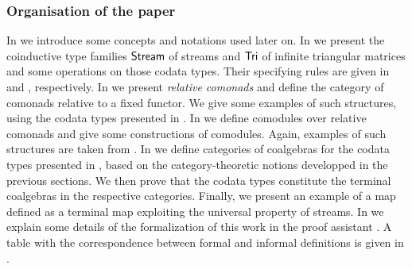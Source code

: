 \documentclass[envcountsame]{llncs}
\begin{document}
\begin{Long}
 
 \subsubsection*{Organisation of the paper}
  In  we introduce some concepts and notations used later on.
  In  we present the coinductive type families $\mathsf{Stream}$ of streams and $\mathsf{Tri}$ of infinite triangular matrices and some operations on those
           codata types.
   Their specifying rules are given in  and , respectively.
  In  we present \emph{relative comonads} and define the category of comonads relative to a fixed functor.
    We give some examples of such structures, using the codata types presented in .
  In  we define comodules over relative comonads and give some constructions of comodules.
     Again, examples of such structures are taken from .
  In  we define categories of coalgebras for the codata types presented in ,
      based on the category-theoretic notions developped in the previous sections.
      We then prove that the codata types constitute the terminal coalgebras in the respective categories.
      Finally, we present an example of a map defined as a terminal map exploiting the universal property of streams.
  In  we explain some details of the formalization of this work in the proof assistant \coq.
  A table with the correspondence between formal and informal definitions is given in .

\end{Long}

%  
  
  
  
\end{document}

